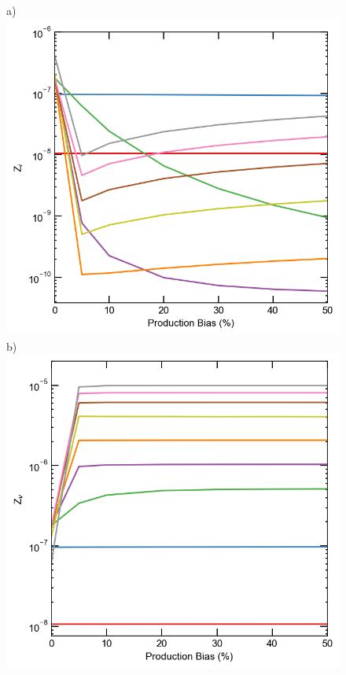 \documentclass[utf8]{frontiersSCNS} %
\begin{document}
    \begin{figure}[h!]  %
        \centering
        a)\includegraphics[scale=0.55]{sink_strength_ion_Zi_scaled_nolegend}
        b)\includegraphics[scale=0.55]{sink_strength_ion_Zv_scaled_nolegend}

\end{figure}
\end{document}
